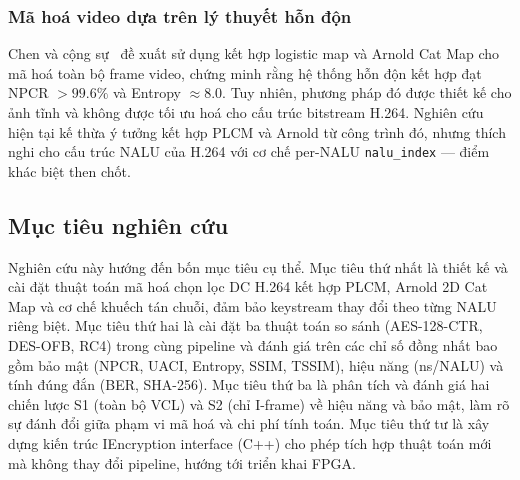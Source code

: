 \subsubsection{Mã hoá video dựa trên lý thuyết hỗn độn}

Chen và cộng sự~\cite{chen_chaos_video} đề xuất sử dụng kết hợp logistic map và Arnold Cat Map cho mã hoá toàn bộ frame video, chứng minh rằng hệ thống hỗn độn kết hợp đạt NPCR $> 99.6\%$ và Entropy $\approx 8.0$. Tuy nhiên, phương pháp đó được thiết kế cho ảnh tĩnh và không được tối ưu hoá cho cấu trúc bitstream H.264. Nghiên cứu hiện tại kế thừa ý tưởng kết hợp PLCM và Arnold từ công trình đó, nhưng thích nghi cho cấu trúc NALU của H.264 với cơ chế per-NALU \texttt{nalu\_index} --- điểm khác biệt then chốt.

\subsection{Mục tiêu nghiên cứu}

Nghiên cứu này hướng đến bốn mục tiêu cụ thể. Mục tiêu thứ nhất là thiết kế và cài đặt thuật toán mã hoá chọn lọc DC H.264 kết hợp PLCM, Arnold 2D Cat Map và cơ chế khuếch tán chuỗi, đảm bảo keystream thay đổi theo từng NALU riêng biệt. Mục tiêu thứ hai là cài đặt ba thuật toán so sánh (AES-128-CTR, DES-OFB, RC4) trong cùng pipeline và đánh giá trên các chỉ số đồng nhất bao gồm bảo mật (NPCR, UACI, Entropy, SSIM, TSSIM), hiệu năng (ns/NALU) và tính đúng đắn (BER, SHA-256). Mục tiêu thứ ba là phân tích và đánh giá hai chiến lược S1 (toàn bộ VCL) và S2 (chỉ I-frame) về hiệu năng và bảo mật, làm rõ sự đánh đổi giữa phạm vi mã hoá và chi phí tính toán. Mục tiêu thứ tư là xây dựng kiến trúc IEncryption interface (C++) cho phép tích hợp thuật toán mới mà không thay đổi pipeline, hướng tới triển khai FPGA.

